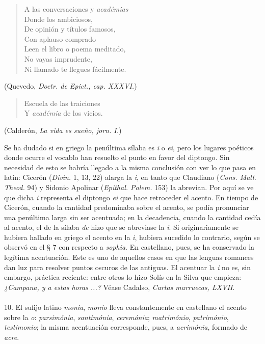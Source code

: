 \documentclass{article}
\begin{document}
\begin{verse}
A las conversaciones y \emph{académias} \\
Donde los ambiciosos, \\
De opinión y títulos famosos, \\
Con aplauso comprado \\
Leen el libro o poema meditado, \\
No vayas imprudente, \\
Ni llamado te llegues fácilmente.
\end{verse}
\begin{flushright}
(Quevedo, \emph{Doctr. de Epict., cap. XXXVI.})
\end{flushright}

\begin{verse}
Escuela de las traiciones \\
Y \emph{académia} de los vicios.
\end{verse}
\begin{flushright}
(Calderón, \emph{La vida es sueño, jorn. I.})
\end{flushright}

Se ha dudado si en griego la penúltima sílaba es \emph{i} o \emph{ei}, 
pero los lugares poéticos donde ocurre el vocablo han resuelto el punto 
en favor del diptongo. Sin necesidad de esto se habría llegado a la misma
conclusión con ver lo que pasa en latín: Cicerón (\emph{Divin.} 1, 13, 22)
alarga la \emph{i}, en tanto que Claudiano (\emph{Cons. Mall. Theod.} 94)
y Sidonio Apolinar (\emph{Epithal. Polem.} 153) la abrevian. Por aquí se ve
que dicha \emph{i} representa el diptongo \emph{ei} que hace retroceder
el acento. En tiempo de Cicerón, cuando la cantidad predominaba sobre el
acento, se podía pronunciar una penúltima larga sin ser acentuada; en la 
decadencia, cuando la cantidad cedía al acento, el de la sílaba \emph{de}
hizo que se abreviase la \emph{i}. Si originariamente se hubiera hallado
en griego el acento en la \emph{i}, hubiera sucedido lo contrario, según se 
observó en el \S{} 7 con respecto a \emph{sophia}. En castellano, pues, se ha 
conservado la legítima acentuación. Este es uno de aquellos casos en que las
lenguas romances dan luz para resolver puntos oscuros de las antiguas.
El acentuar la \emph{i} no es, sin embargo, práctica reciente: entre otros
lo hizo Solís en la Silva que empieza: \emph{¿Campana, y a estas horas ...?}
Véase Cadalso, \emph{Cartas marruecas, LXVII}.

\normalsize

\paragraph{} 10. El sufijo latino \emph{monia}, \emph{monio} lleva constantemente en 
castellano el acento sobre la \emph{o}: \emph{parsimónia}, \emph{santimónia}, 
\emph{ceremónia}; \emph{matrimónio}, \emph{património}, \emph{testimonio}; la misma acentuación corresponde, pues, a \emph{acrimónia}, formado de \emph{acre}.
\end{document}
